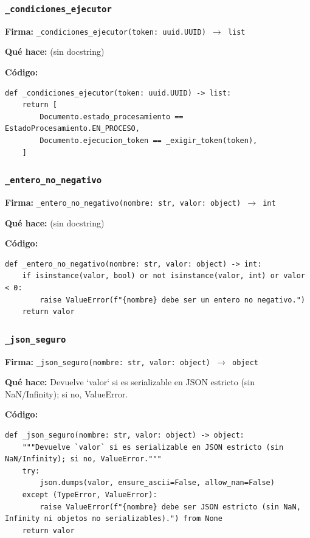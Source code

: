 \documentclass[11pt,a4paper]{article}
\begin{document}
\subsubsection*{\texttt{\_condiciones\_ejecutor}}
\textbf{Firma:} \texttt{\_condiciones\_ejecutor(token: uuid.UUID) $\rightarrow$ list}

\textbf{Qué hace:} (sin docstring)

\textbf{Código:}
\begin{lstlisting}
def _condiciones_ejecutor(token: uuid.UUID) -> list:
    return [
        Documento.estado_procesamiento == EstadoProcesamiento.EN_PROCESO,
        Documento.ejecucion_token == _exigir_token(token),
    ]
\end{lstlisting}

\subsubsection*{\texttt{\_entero\_no\_negativo}}
\textbf{Firma:} \texttt{\_entero\_no\_negativo(nombre: str, valor: object) $\rightarrow$ int}

\textbf{Qué hace:} (sin docstring)

\textbf{Código:}
\begin{lstlisting}
def _entero_no_negativo(nombre: str, valor: object) -> int:
    if isinstance(valor, bool) or not isinstance(valor, int) or valor < 0:
        raise ValueError(f"{nombre} debe ser un entero no negativo.")
    return valor
\end{lstlisting}

\subsubsection*{\texttt{\_json\_seguro}}
\textbf{Firma:} \texttt{\_json\_seguro(nombre: str, valor: object) $\rightarrow$ object}

\textbf{Qué hace:} Devuelve `valor` si es serializable en JSON estricto (sin NaN/Infinity); si no, ValueError.

\textbf{Código:}
\begin{lstlisting}
def _json_seguro(nombre: str, valor: object) -> object:
    """Devuelve `valor` si es serializable en JSON estricto (sin NaN/Infinity); si no, ValueError."""
    try:
        json.dumps(valor, ensure_ascii=False, allow_nan=False)
    except (TypeError, ValueError):
        raise ValueError(f"{nombre} debe ser JSON estricto (sin NaN, Infinity ni objetos no serializables).") from None
    return valor
\end{lstlisting}
\end{document}
